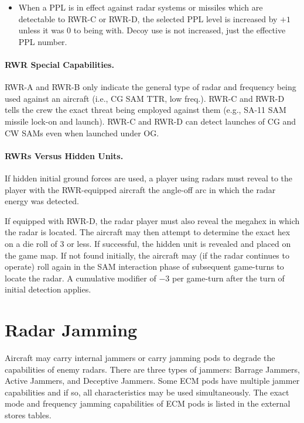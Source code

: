 \begin{itemize}
    \item When a PPL is in effect against radar systems or missiles which are detectable to RWR-C or RWR-D, the selected PPL level is increased by $+1$ unless it was 0 to being with. Decoy use is not increased, just the effective PPL number.
\end{itemize}

\paragraph{RWR Special Capabilities.} RWR-A and RWR-B only indicate the general type of radar and frequency being used against an aircraft (i.e., CG SAM TTR, low freq.). RWR-C and RWR-D tells the crew the exact threat being employed against them (e.g., SA-11 SAM missile lock-on and launch). RWR-C and RWR-D can detect launches of CG and CW SAMs even when launched under OG.

\paragraph{RWRs Versus Hidden Units.} If hidden initial ground forces are used, a player using radars must reveal to the player with the RWR-equipped aircraft the angle-off arc in which the radar energy was detected.

If equipped with RWR-D, the radar player must also reveal the megahex in which the radar is located. The aircraft may then attempt to determine the exact hex on a die roll of 3 or less. If successful, the hidden unit is revealed and placed on the game map. If not found initially, the aircraft may (if the radar continues to operate) roll again in the SAM interaction phase of subsequent game-turns to locate the radar. A cumulative modifier of $-3$ per game-turn after the turn of initial detection applies.

\section{Radar Jamming}

Aircraft may carry internal jammers or carry jamming pods to degrade the capabilities of enemy radars. There are three types of jammers: Barrage Jammers, Active Jammers, and Deceptive Jammers. Some ECM pods have multiple jammer capabilities and if so, all characteristics may be used simultaneously. The exact mode and frequency jamming capabilities of ECM pods is listed in the external stores tables. 

